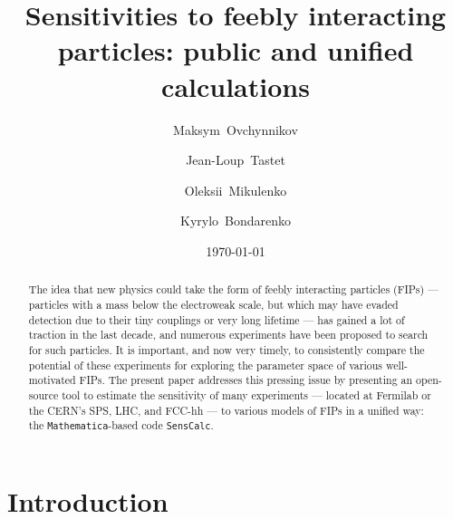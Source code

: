 \documentclass[
    aps,prd,
    twocolumn,
    nofootinbib,
    superscriptaddress,
]{revtex4}
\begin{document}
\title{Sensitivities to feebly interacting particles: public and unified calculations}

\author{Maksym~Ovchynnikov}

\author{Jean-Loup~Tastet}

\author{Oleksii~Mikulenko}

\author{Kyrylo~Bondarenko}

\date{\today}

\begin{abstract}
The idea that new physics could take the form of feebly interacting particles (FIPs) --- particles with a mass below the electroweak scale, but which may have evaded detection due to their tiny couplings or very long lifetime --- has gained a lot of traction in the last decade, and numerous experiments have been proposed to search for such particles. It is important, and now very timely, to consistently compare the potential of these experiments for exploring the parameter space of various well-motivated FIPs. The present paper addresses this pressing issue by presenting an open-source tool to estimate the sensitivity of many experiments --- located at Fermilab or the CERN's SPS, LHC, and FCC-hh --- to various models of FIPs in a unified way: the \texttt{Mathematica}-based code \texttt{SensCalc}.
\end{abstract}

\maketitle

\section{Introduction}
\label{sec:introduction}
\end{document}
